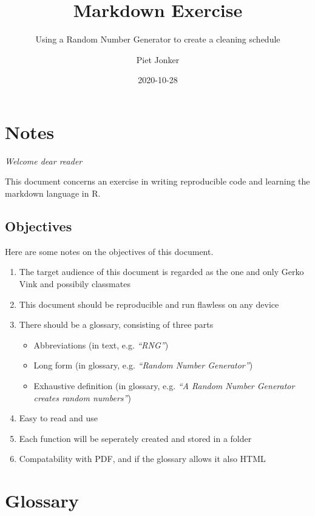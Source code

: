 \documentclass[openany]{book}
\title{Markdown Exercise}
\subtitle{Using a Random Number Generator to create a cleaning schedule}
\author{Piet Jonker}
\date{2020-10-28}
\providecommand{\tightlist}{%
  \setlength{\itemsep}{0pt}\setlength{\parskip}{0pt}}
\begin{document}
\maketitle

{
\hypersetup{linkcolor=}
\setcounter{tocdepth}{1}
\tableofcontents
}
\hypertarget{notes}{%
\chapter*{Notes}\label{notes}}

\emph{Welcome dear reader}

This document concerns an exercise in writing reproducible code and learning the markdown language in R.

\hypertarget{objectives}{%
\section*{Objectives}\label{objectives}}

Here are some notes on the objectives of this document.

\begin{enumerate}
\def\labelenumi{\arabic{enumi}.}
\tightlist
\item
  The target audience of this document is regarded as the one and only Gerko Vink and possibily classmates
\item
  This document should be reproducible and run flawless on any device
\item
  There should be a glossary, consisting of three parts

  \begin{itemize}
  \tightlist
  \item
    Abbreviations (in text, e.g. \emph{``RNG''})
  \item
    Long form (in glossary, e.g. \emph{``Random Number Generator''})
  \item
    Exhaustive definition (in glossary, e.g. \emph{``A Random Number Generator creates random numbers''})
  \end{itemize}
\item
  Easy to read and use
\item
  Each function will be seperately created and stored in a folder
\item
  Compatability with PDF, and if the glossary allows it also HTML
\end{enumerate}

\hypertarget{gloss}{%
\chapter*{Glossary}\label{gloss}}
\end{document}
